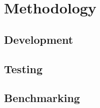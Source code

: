 \chapter{Methodology}
\blindtext{}

\section{Development}
\blindtext{}

\section{Testing}
\blindtext{}

\section{Benchmarking}
\blindtext{}
